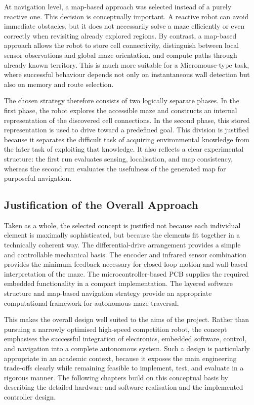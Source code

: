 At navigation level, a map-based approach was selected instead of a purely reactive one. This decision is conceptually important. A reactive robot can avoid immediate obstacles, but it does not necessarily solve a maze efficiently or even correctly when revisiting already explored regions. By contrast, a map-based approach allows the robot to store cell connectivity, distinguish between local sensor observations and global maze orientation, and compute paths through already known territory. This is much more suitable for a Micromouse-type task, where successful behaviour depends not only on instantaneous wall detection but also on memory and route selection.

The chosen strategy therefore consists of two logically separate phases. In the first phase, the robot explores the accessible maze and constructs an internal representation of the discovered cell connections. In the second phase, this stored representation is used to drive toward a predefined goal. This division is justified because it separates the difficult task of acquiring environmental knowledge from the later task of exploiting that knowledge. It also reflects a clear experimental structure: the first run evaluates sensing, localisation, and map consistency, whereas the second run evaluates the usefulness of the generated map for purposeful navigation.

\subsection{Justification of the Overall Approach}

Taken as a whole, the selected concept is justified not because each individual element is maximally sophisticated, but because the elements fit together in a technically coherent way. The differential-drive arrangement provides a simple and controllable mechanical basis. The encoder and infrared sensor combination provides the minimum feedback necessary for closed-loop motion and wall-based interpretation of the maze. The microcontroller-based PCB supplies the required embedded functionality in a compact implementation. The layered software structure and map-based navigation strategy provide an appropriate computational framework for autonomous maze traversal.

This makes the overall design well suited to the aims of the project. Rather than pursuing a narrowly optimised high-speed competition robot, the concept emphasises the successful integration of electronics, embedded software, control, and navigation into a complete autonomous system. Such a design is particularly appropriate in an academic context, because it exposes the main engineering trade-offs clearly while remaining feasible to implement, test, and evaluate in a rigorous manner. The following chapters build on this conceptual basis by describing the detailed hardware and software realisation and the implemented controller design.
